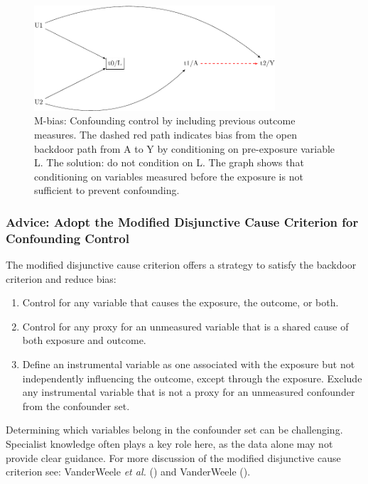 \documentclass[
  singlecolumn,
  9pt]{article}
\providecommand{\tightlist}{%
  \setlength{\itemsep}{0pt}\setlength{\parskip}{0pt}}\usepackage{longtable,booktabs,array}
\begin{document}
\begin{figure}

{\centering \includegraphics[width=0.8\textwidth,height=\textheight]{causal-dags_files/figure-pdf/fig-m-bias-1.pdf}

}

\caption{\label{fig-m-bias}M-bias: Confounding control by including
previous outcome measures. The dashed red path indicates bias from the
open backdoor path from A to Y by conditioning on pre-exposure variable
L. The solution: do not condition on L. The graph shows that
conditioning on variables measured before the exposure is not sufficient
to prevent confounding.}

\end{figure}

\subsubsection{Advice: Adopt the Modified Disjunctive Cause Criterion
for Confounding
Control}\label{advice-adopt-the-modified-disjunctive-cause-criterion-for-confounding-control}

The modified disjunctive cause criterion offers a strategy to satisfy
the backdoor criterion and reduce bias:

\begin{enumerate}
\def\labelenumi{\alph{enumi}.}
\tightlist
\item
  Control for any variable that causes the exposure, the outcome, or
  both.
\item
  Control for any proxy for an unmeasured variable that is a shared
  cause of both exposure and outcome.
\item
  Define an instrumental variable as one associated with the exposure
  but not independently influencing the outcome, except through the
  exposure. Exclude any instrumental variable that is not a proxy for an
  unmeasured confounder from the confounder set.
\end{enumerate}

Determining which variables belong in the confounder set can be
challenging. Specialist knowledge often plays a key role here, as the
data alone may not provide clear guidance. For more discussion of the
modified disjunctive cause criterion see: VanderWeele \emph{et al.}
() and VanderWeele
().
\end{document}
